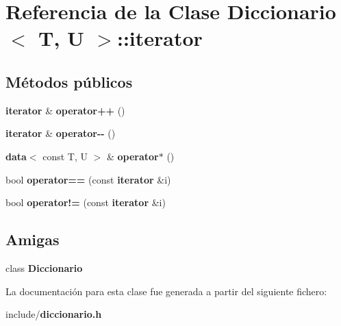 \section{Referencia de la Clase Diccionario$<$ T, U $>$\+:\+:iterator}
\label{classDiccionario_1_1iterator}
\subsection*{Métodos públicos}
\begin{DoxyCompactItemize}
\item 
{\bf iterator} \& {\bfseries operator++} ()\label{classDiccionario_1_1iterator_aaf5fab050eb47cf1cb68f94d7335c33f}

\item 
{\bf iterator} \& {\bfseries operator-\/-\/} ()\label{classDiccionario_1_1iterator_a93e2bbded4ff4b10a96c51cf993dad84}

\item 
{\bf data}$<$ const T, U $>$ \& {\bfseries operator$\ast$} ()\label{classDiccionario_1_1iterator_aceb8c07d114ae8044470135ebe77a7b0}

\item 
bool {\bfseries operator==} (const {\bf iterator} \&i)\label{classDiccionario_1_1iterator_a12322ce23e125fa807b56efac74b898a}

\item 
bool {\bfseries operator!=} (const {\bf iterator} \&i)\label{classDiccionario_1_1iterator_a8f480389fc693b17f1664495fc22bcc3}

\end{DoxyCompactItemize}
\subsection*{Amigas}
\begin{DoxyCompactItemize}
\item 
class {\bfseries Diccionario}\label{classDiccionario_1_1iterator_ad36be158dde0129b4e0d03d0e454a26b}

\end{DoxyCompactItemize}


La documentación para esta clase fue generada a partir del siguiente fichero\+:\begin{DoxyCompactItemize}
\item 
include/{\bf diccionario.\+h}\end{DoxyCompactItemize}
